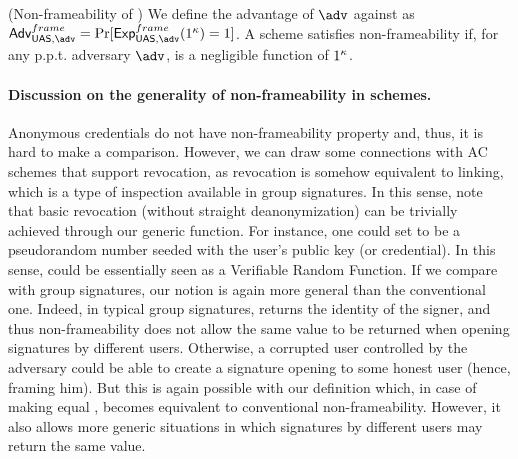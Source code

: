 \begin{definition}{(Non-frameability of \UAS)}
  We define the advantage \AdvNonframe of $\adv$ against \ExpNonframe as
  $\AdvNonframe=\Pr\lbrack\ExpNonframe(1^\secpar)=1\rbrack$.
  A \GSAC scheme satisfies non-frameability if, for any p.p.t. adversary $\adv$,
  \AdvNonframe is a negligible function of $1^\kappa$.
\end{definition}

\paragraph{Discussion on the generality of non-frameability in \UAS schemes.} %
Anonymous credentials do not have non-frameability property and, thus, it is
hard to make a comparison. However, we can draw some connections with AC schemes
that support revocation, as revocation is somehow equivalent to linking, which
is a type of inspection available in group signatures. In this sense, note that
basic revocation (without straight deanonymization) can be trivially achieved
through our generic \Inspect function. For instance, one could set \finsp to
be a pseudorandom number seeded with the user's public key (or credential). In
this sense, \Inspect could be essentially seen as a Verifiable Random Function.
If we compare with group signatures, our notion is again more general than the
conventional one. Indeed, in typical group signatures, \Open returns the
identity of the signer, and thus non-frameability does not allow the same value
to be returned when opening signatures by different users. Otherwise, a
corrupted user controlled by the adversary could be able to create a signature
opening to some honest user (hence, framing him). But this is again possible
with our definition which, in case of making \Inspect equal \Open, becomes
equivalent to conventional non-frameability. However, it also allows more
generic situations in which signatures by different users may return the same
value. 
  

